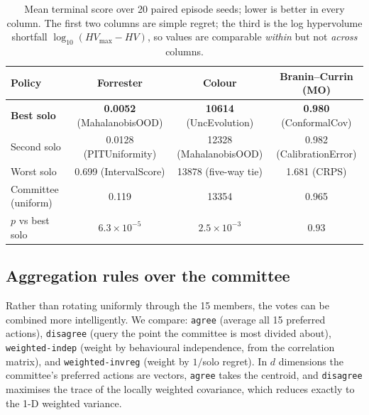 \documentclass[11pt]{article}
\begin{document}
\begin{table}[H]
\centering
\small
\begin{tabular}{lccc}
\toprule
Policy & Forrester & Colour & Branin--Currin (MO) \\
\midrule
\textbf{Best solo} & \textbf{0.0052} (MahalanobisOOD) & \textbf{10614} (UncEvolution) & \textbf{0.980} (ConformalCov) \\
Second solo & 0.0128 (PITUniformity) & 12328 (MahalanobisOOD) & 0.982 (CalibrationError) \\
Worst solo & 0.699 (IntervalScore) & 13878 (five-way tie) & 1.681 (CRPS) \\
\midrule
Committee (uniform) & 0.119 & 13354 & 0.965 \\
$p$ vs best solo & $6.3\times10^{-5}$ & $2.5\times10^{-3}$ & $0.93$ \\
\bottomrule
\end{tabular}
\caption{Mean terminal score over 20 paired episode seeds; lower is better in every column. The first two columns are simple regret; the third is the log hypervolume shortfall $\log_{10}(HV_{\max} - HV)$, so values are comparable \emph{within} but not \emph{across} columns.}
\label{tab:solo}
\end{table}

\subsection{Aggregation rules over the committee}

Rather than rotating uniformly through the 15 members, the votes can be combined more intelligently. We compare: \texttt{agree} (average all 15 preferred actions), \texttt{disagree} (query the point the committee is most divided about), \texttt{weighted-indep} (weight by behavioural independence, from the correlation matrix), and \texttt{weighted-invreg} (weight by $1/$solo regret). In $d$ dimensions the committee's preferred actions are vectors, \texttt{agree} takes the centroid, and \texttt{disagree} maximises the trace of the locally weighted covariance, which reduces exactly to the 1-D weighted variance.
\end{document}
